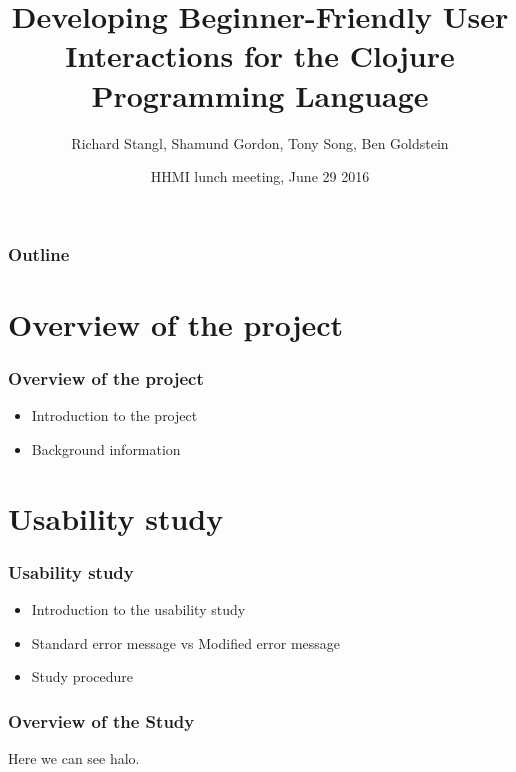 \documentclass{beamer}
\begin{document}
\title{Developing Beginner-Friendly User Interactions for the Clojure Programming Language}
\author{Richard Stangl, Shamund Gordon, Tony Song, Ben Goldstein}
\date[]  
{HHMI lunch meeting, June 29 2016}

\begin{frame}
  \titlepage
\end{frame}


\begin{frame}

\frametitle{Outline}
\tableofcontents
\end{frame}

\section{Overview of the project}

\begin{frame}
  \frametitle{Overview of the project}
\begin{itemize}
\item Introduction to the project 
\item Background information
\end{itemize}
\end{frame}




\section{Usability study}

\begin{frame}
  \frametitle{Usability study}
\begin{itemize}
\item Introduction to the usability study 
\item Standard error message vs Modified error message
\item Study procedure
\end{itemize}
\end{frame}

\begin{frame}
  \frametitle{Overview of the Study}
\begin{figure}

\end{figure}

Here we can see halo. 
\end{frame}
\end{document}
